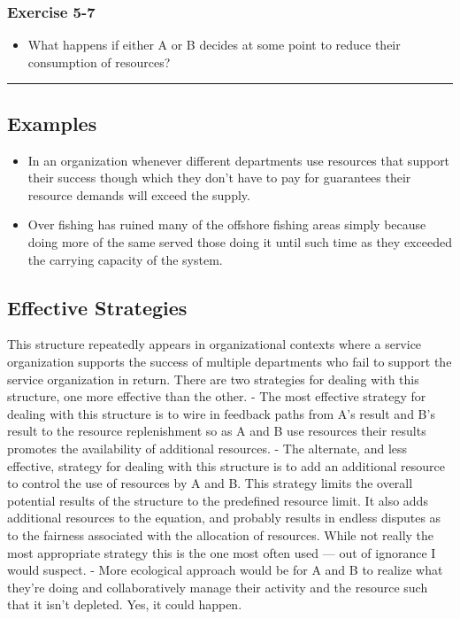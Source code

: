 \documentclass[]{memoir}
\begin{document}
\subsubsection{Exercise 5-7}

\begin{itemize}
\itemsep1pt\parskip0pt
\item
  What happens if either A or B decides at some point to reduce their
  consumption of resources?
\end{itemize}

\begin{center}\rule{3in}{0.4pt}\end{center}

\subsection{Examples}

\begin{itemize}
\itemsep1pt\parskip0pt
\item
  In an organization whenever different departments use resources that
  support their success though which they don't have to pay for
  guarantees their resource demands will exceed the supply.
\item
  Over fishing has ruined many of the offshore fishing areas simply
  because doing more of the same served those doing it until such time
  as they exceeded the carrying capacity of the system.
\end{itemize}

\subsection{Effective Strategies}

This structure repeatedly appears in organizational contexts where a
service organization supports the success of multiple departments who
fail to support the service organization in return. There are two
strategies for dealing with this structure, one more effective than the
other. - The most effective strategy for dealing with this structure is
to wire in feedback paths from A's result and B's result to the resource
replenishment so as A and B use resources their results promotes the
availability of additional resources. - The alternate, and less
effective, strategy for dealing with this structure is to add an
additional resource to control the use of resources by A and B. This
strategy limits the overall potential results of the structure to the
predefined resource limit. It also adds additional resources to the
equation, and probably results in endless disputes as to the fairness
associated with the allocation of resources. While not really the most
appropriate strategy this is the one most often used --- out of
ignorance I would suspect. - More ecological approach would be for A and
B to realize what they're doing and collaboratively manage their
activity and the resource such that it isn't depleted. Yes, it could
happen.
\end{document}
